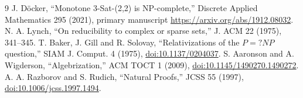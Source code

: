 \documentclass[11pt]{article}
\begin{document}
\begin{thebibliography}{9}
 J. D\"ocker, ``Monotone 3-Sat-(2,2) is NP-complete,''
Discrete Applied Mathematics 295 (2021), primary manuscript
\url{https://arxiv.org/abs/1912.08032}.
 N. A. Lynch, ``On reducibility to complex or sparse sets,''
J. ACM 22 (1975), 341--345.
 T. Baker, J. Gill and R. Solovay, ``Relativizations of the
$P=?NP$ question,'' SIAM J. Comput. 4 (1975),
\href{https://doi.org/10.1137/0204037}{doi:10.1137/0204037}.
 S. Aaronson and A. Wigderson, ``Algebrization,'' ACM TOCT 1
(2009), \href{https://doi.org/10.1145/1490270.1490272}{doi:10.1145/1490270.1490272}.
 A. A. Razborov and S. Rudich, ``Natural Proofs,'' JCSS 55
(1997), \href{https://doi.org/10.1006/jcss.1997.1494}{doi:10.1006/jcss.1997.1494}.
\end{thebibliography}

\end{document}
